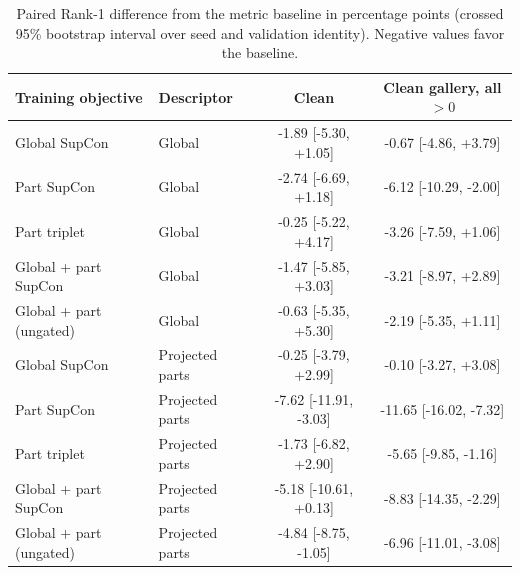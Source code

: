 \documentclass[pdflatex,iicol,sn-apa]{sn-jnl}
\begin{document}
\begin{table}[t]
\centering
\caption{Paired Rank-1 difference from the metric baseline in percentage points
(crossed 95\% bootstrap interval over seed and validation identity).
Negative values favor the baseline.}
\label{tab:paired-results}
\small
\setlength{\tabcolsep}{4pt}
\begin{tabularx}{\textwidth}{@{}>{\raggedright\arraybackslash}Xlcc@{}}
\toprule
Training objective & Descriptor & Clean & \shortstack{Clean gallery,\\all $>0$} \\
\midrule
Global SupCon & Global & -1.89 [-5.30, +1.05] & -0.67 [-4.86, +3.79] \\
Part SupCon & Global & -2.74 [-6.69, +1.18] & -6.12 [-10.29, -2.00] \\
Part triplet & Global & -0.25 [-5.22, +4.17] & -3.26 [-7.59, +1.06] \\
Global + part SupCon & Global & -1.47 [-5.85, +3.03] & -3.21 [-8.97, +2.89] \\
Global + part (ungated) & Global & -0.63 [-5.35, +5.30] & -2.19 [-5.35, +1.11] \\
Global SupCon & Projected parts & -0.25 [-3.79, +2.99] & -0.10 [-3.27, +3.08] \\
Part SupCon & Projected parts & -7.62 [-11.91, -3.03] & -11.65 [-16.02, -7.32] \\
Part triplet & Projected parts & -1.73 [-6.82, +2.90] & -5.65 [-9.85, -1.16] \\
Global + part SupCon & Projected parts & -5.18 [-10.61, +0.13] & -8.83 [-14.35, -2.29] \\
Global + part (ungated) & Projected parts & -4.84 [-8.75, -1.05] & -6.96 [-11.01, -3.08] \\
\bottomrule
\end{tabularx}
\vspace{0.5em}


\end{table}
\end{document}
